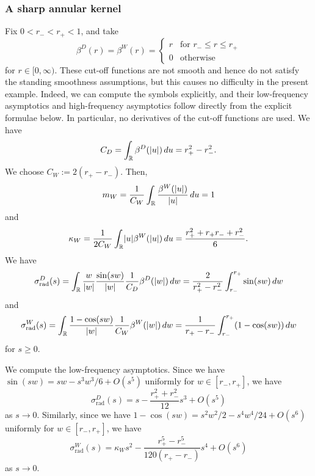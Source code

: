 \documentclass[a4paper,oneside,12pt]{amsart}
\theoremstyle{plain}
\theoremstyle{definition}
\theoremstyle{remark}
\newcommand{\R}{\mathbb{R}}
\DeclarePairedDelimiter{\abs}{\lvert}{\rvert}
\newcommand{\cutoff}{\beta}
\newcommand{\cutoffDirac}{\cutoff^D}
\newcommand{\cutoffWilson}{\cutoff^W}
\newcommand{\symbolDirac}{\sigma^D}
\newcommand{\symbolWilson}{\sigma^W}
\newcommand{\radialsymbolDirac}{\symbolDirac_{\mathrm{rad}}}
\newcommand{\radialsymbolWilson}{\symbolWilson_{\mathrm{rad}}}
\begin{document}
\subsubsection{A sharp annular kernel}

Fix $0 < r_- < r_+ < 1$, and take
\begin{equation}
  \cutoffDirac(r) = \cutoffWilson(r) =
  \begin{cases}
    r & \text{for } r_- \le r \le r_+ \\
    0 & \text{otherwise}
  \end{cases}
\end{equation}
for $r \in [0,\infty)$.
These cut-off functions are not smooth and hence do not satisfy the standing smoothness assumptions, but this causes no difficulty in the present example.
Indeed, we can compute the symbols explicitly, and their low-frequency asymptotics and high-frequency asymptotics follow directly from the explicit formulae below.
In particular, no derivatives of the cut-off functions are used.
We have
\begin{equation}
  C_D = \int_{\R} \cutoffDirac(\abs{u}) \,du = r_+^2 - r_-^2.
\end{equation}
We choose $C_W := 2(r_+ - r_-)$.
Then,
\begin{equation}
  m_W = \frac{1}{C_W} \int_{\R} \frac{\cutoffWilson(\abs{u})}{\abs{u}} \,du = 1
\end{equation}
and
\begin{equation}
  \kappa_W = \frac{1}{2C_W} \int_{\R} \abs{u}\cutoffWilson(\abs{u}) \,du = \frac{r_+^2 + r_+r_- + r_-^2}{6}.
\end{equation}
We have
\begin{equation}
  \radialsymbolDirac(s) = \int_{\R} \frac{w}{\abs{w}} \frac{\sin(sw)}{\abs{w}} \frac{1}{C_D} \cutoffDirac(\abs{w}) \,dw = \frac{2}{r_+^2-r_-^2} \int_{r_-}^{r_+} \sin(sw) \,dw
\end{equation}
and
\begin{equation}
  \radialsymbolWilson(s) = \int_{\R} \frac{1-\cos(sw)}{\abs{w}} \frac{1}{C_W} \cutoffWilson(\abs{w}) \,dw = \frac{1}{r_+ - r_-} \int_{r_-}^{r_+} (1-\cos(sw)) \,dw
\end{equation}
for $s \ge 0$.

We compute the low-frequency asymptotics.
Since we have $\sin (sw) = sw - s^3w^3/6 + O(s^5)$ uniformly for $w \in [r_-,r_+]$, we have
\begin{equation}
  \radialsymbolDirac(s) = s - \frac{r_+^2+r_-^2}{12} s^3 + O(s^5)
\end{equation}
as $s \to 0$.
Similarly, since we have $1-\cos(sw) = s^2w^2/2 - s^4w^4/24 + O(s^6)$ uniformly for $w \in [r_-,r_+]$, we have
\begin{equation}
  \radialsymbolWilson(s) = \kappa_W s^2 - \frac{r_+^5-r_-^5}{120(r_+-r_-)}s^4 + O(s^6)
\end{equation}
as $s \to 0$.
\end{document}
